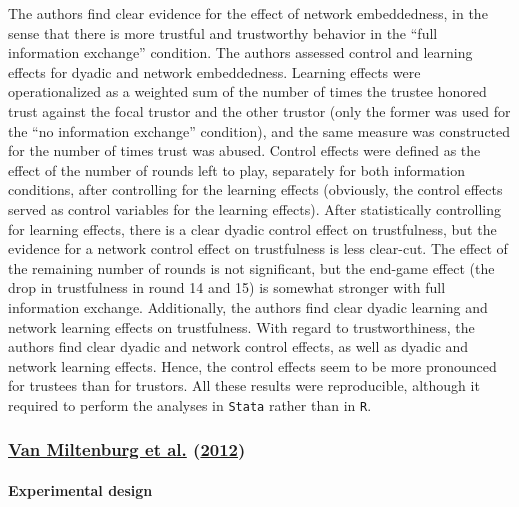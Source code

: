 \documentclass[
  11pt,
]{article}
\begin{document}
The authors find clear evidence for the effect of network embeddedness, in the sense that there is more trustful and trustworthy behavior in the ``full information exchange'' condition.
The authors assessed control and learning effects for dyadic and network embeddedness.
Learning effects were operationalized as a weighted sum of the number of times the trustee honored trust against the focal trustor and the other trustor (only the former was used for the ``no information exchange'' condition), and the same measure was constructed for the number of times trust was abused.
Control effects were defined as the effect of the number of rounds left to play, separately for both information conditions, after controlling for the learning effects (obviously, the control effects served as control variables for the learning effects).
After statistically controlling for learning effects, there is a clear dyadic control effect on trustfulness, but the evidence for a network control effect on trustfulness is less clear-cut.
The effect of the remaining number of rounds is not significant, but the end-game effect (the drop in trustfulness in round 14 and 15) is somewhat stronger with full information exchange.
Additionally, the authors find clear dyadic learning and network learning effects on trustfulness.
With regard to trustworthiness, the authors find clear dyadic and network control effects, as well as dyadic and network learning effects.
Hence, the control effects seem to be more pronounced for trustees than for trustors.
All these results were reproducible, although it required to perform the analyses in \texttt{Stata} rather than in \texttt{R}.

\hypertarget{miltenburg_buskens_triads_2012}{%
\subsubsection{\texorpdfstring{\protect\hyperlink{ref-miltenburg_buskens_triads_2012}{Van Miltenburg et al.} (\protect\hyperlink{ref-miltenburg_buskens_triads_2012}{2012})}{Van Miltenburg et al. (2012)}}\label{miltenburg_buskens_triads_2012}}

\hypertarget{experimental-design-5}{%
\paragraph{Experimental design}\label{experimental-design-5}}
\end{document}
